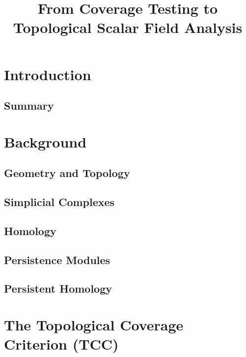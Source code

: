 \documentclass[12pt]{article}
\begin{document}
\title{From Coverage Testing to Topological Scalar Field Analysis}
\maketitle



\section{Introduction}\label{sec:introduction}
  

\subsection{Summary}
  

\clearpage
\section{Background}

\subsection{Geometry and Topology}
  

\subsection{Simplicial Complexes}\label{sec:complexes}
  
%
%
\subsection{Homology}\label{sec:homology}
  
%
\subsection{Persistence Modules}
  
%
\subsection{Persistent Homology}
  


\clearpage
\section{The Topological Coverage Criterion (TCC)}\label{sec:tcc}

\end{document}
